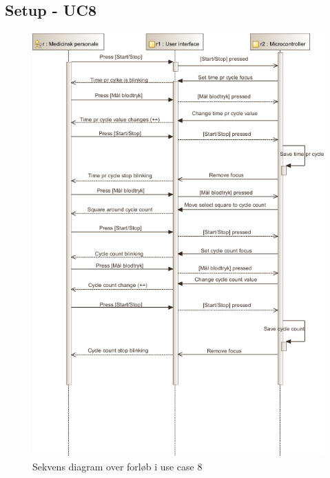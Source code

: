 \subsection{Setup - UC8}
\begin{figure}[H]
	\includegraphics[width=\textwidth]{pdfs/SD_UC8-crop.pdf}
\caption{Sekvens diagram over forløb i use case 8}
\end{figure}
\newpage
